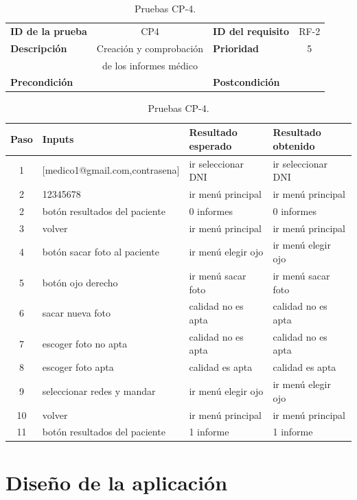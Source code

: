 \begin{table}[htbp]
    \centering
    \begin{tabular}{|lc|lc|}
    \toprule
         \textbf{ID de la prueba} & CP4 & \textbf{ID del requisito} & RF-2\\
        \textbf{Descripción} &  Creación y comprobación  & \textbf{Prioridad} & 5\\
         & de los informes médico & & \\
        \textbf{Precondición} &   & \textbf{Postcondición} &   \\
        \bottomrule
    \end{tabular}
    \centering
    \begin{tabular}{clll}
    \toprule
    Paso & Inputs & Resultado esperado & Resultado obtenido  \\
    \midrule
    
    1 & [medico1@gmail.com,contrasena] & ir seleccionar DNI & ir seleccionar DNI  \\
    2 & 12345678 & ir menú principal & ir menú principal  \\
    2 & botón resultados del paciente & 0 informes & 0 informes  \\
    3 & volver & ir menú principal & ir menú principal  \\
    4 & botón sacar foto al paciente & ir menú elegir ojo & ir menú elegir ojo \\
    5 & botón ojo derecho & ir menú sacar foto & ir menú sacar foto  \\
    6  & sacar nueva foto & calidad no es apta & calidad no es apta  \\
    7  & escoger foto no apta & calidad no es apta & calidad no es apta  \\
    8  & escoger foto apta & calidad es apta & calidad es apta  \\
    9  & seleccionar redes y mandar & ir menú elegir ojo & ir menú elegir ojo  \\
    10  & volver & ir menú principal & ir menú principal  \\
    11  & botón resultados del paciente & 1 informe & 1 informe  \\
    
    
    \bottomrule
    \end{tabular}
\caption{Pruebas CP-4.}
\label{Pruebas CP-4}
\end{table}

\section{Diseño de la aplicación}

